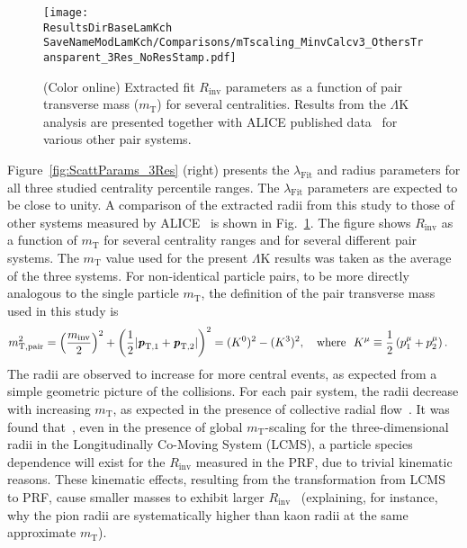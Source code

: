 \documentclass[ALICE,manyauthors]{cernphprep}
\newcommand{\ResultsDirBaseLamKch}{/home/jesse/Analysis/FemtoAnalysis/Results/Results_cLamcKch_20190319/}
\newcommand{\MomRes}{_MomResCrctn}%
\newcommand{\NonFlatBgdLamKch}{_NonFlatBgdCrctnLamK0LamKchPolynomial}
\newcommand{\ResNum}{_3Res}
\newcommand{\PrimMaxDecay}{_PrimMaxDecay10fm}
\newcommand{\ResMethod}{_UsingXiDataAndCoulombOnly}
\newcommand{\ParamFixAndShareLamKch}{_ShareLam_Dualie_ShareLam_ShareRadii}
\newcommand{\SaveNameModLamKch}{\MomRes\NonFlatBgdLamKch\ResNum\PrimMaxDecay\ResMethod\ParamFixAndShareLamKch}
\newcommand{\mt}{$m_{\mathrm{T}}$\xspace}
\newcommand{\LamK}{$\Lambda$K\xspace}
\begin{document}
\begin{figure}[h]
  \centering
  \texttt{[image: \\ResultsDirBaseLamKch\\SaveNameModLamKch/Comparisons/mTscaling\_MinvCalcv3\_OthersTransparent\_3Res\_NoResStamp.pdf]}
  \caption[\mt Scaling of Radii: 3 Residuals in Fit]
  {
  (Color online) Extracted fit $R_{\mathrm{inv}}$ parameters as a function of pair transverse mass (\mt) for several centralities.
  Results from the \LamK analysis are presented together with ALICE published data~\cite{Adam:2015vja} for various other pair systems.  
  }
  \label{fig:mTScalingOfRadii_3Res}
\end{figure}

Figure~\ref{fig:ScattParams_3Res} (right) presents the $\lambda_{\mathrm{Fit}}$ and radius parameters for all three studied centrality percentile ranges.
The $\lambda_{\mathrm{Fit}}$ parameters are expected to be close to unity. 
A comparison of the extracted radii from this study to those of other systems measured by ALICE~\cite{Adam:2015vja} is shown in Fig.~\ref{fig:mTScalingOfRadii_3Res}. 
The figure shows $R_{\mathrm{inv}}$ as a function of \mt for several centrality ranges and for several different pair systems.
The \mt value used for the present \LamK results was taken as the average of the three systems.
For non-identical particle pairs, to be more directly analogous to the single particle \mt, the definition of the pair transverse mass used in this study is
\begin{equation}
\begin{aligned}
 m_{\mathrm{T, pair}}^{2} &= \left( \frac{m_{\mathrm{inv}}}{2} \right)^{2} + \left( \frac{1}{2} |\textbf{\textit{p}}_{\mathrm{T,1}} + \textbf{\textit{p}}_{\mathrm{T,2}}| \right)^{2} = (K^{0})^{2} - (K^{3})^{2}, \quad \mathrm{where} ~~K^{\mu} \equiv \frac{1}{2} \left( p_{1}^{\mu} + p_{2}^{\mu} \right).
\end{aligned}
\label{eqn:PairmTv1}
\end{equation}
The radii are observed to increase for more central events, as expected from a simple geometric picture of the collisions.
For each pair system, the radii decrease with increasing \mt, as expected in the presence of collective radial flow~\cite{Akkelin:1995gh}.
It was found that~\cite{Kisiel:2014upa}, even in the presence of global \mt-scaling for the three-dimensional radii in the Longitudinally Co-Moving System (LCMS), a particle species dependence will exist for the $R_{\mathrm{inv}}$ measured in the PRF, due to trivial kinematic reasons.
These kinematic effects, resulting from the transformation from LCMS to PRF, cause smaller masses to exhibit larger $R_{\mathrm{inv}}$~\cite{Adam:2015vja} (explaining, for instance, why the pion radii are systematically higher than kaon radii at the same approximate \mt).
\end{document}
